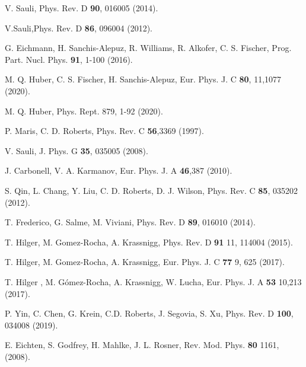 \documentclass[aps,prd,superscriptaddress,eqsecnum,amsfonts,showpacs,epsfig]{revtex4}
\begin{document}
\begin{thebibliography}{00}
V. Sauli, Phys. Rev. D {\bf 90}, 016005 (2014).

V.Sauli,Phys. Rev. D {\bf 86}, 096004 (2012).

G. Eichmann, H. Sanchis-Alepuz, R. Williams, R. Alkofer, C. S. Fischer, Prog. Part. Nucl. Phys. {\bf 91}, 1-100 (2016).

 M. Q. Huber, C. S. Fischer, H. Sanchis-Alepuz,  Eur. Phys. J. C {\bf 80}, 11,1077 (2020).
 
 M. Q. Huber,  Phys. Rept. 879, 1-92 (2020).
    
P. Maris, C. D. Roberts, Phys. Rev. C {\bf 56},3369 (1997).

V. Sauli, J. Phys. G {\bf 35}, 035005 (2008).

 J. Carbonell, V. A. Karmanov, Eur. Phys. J. A {\bf 46},387 (2010).

S. Qin, L. Chang, Y. Liu, C. D. Roberts, D. J. Wilson,    Phys. Rev. C {\bf 85},  035202 (2012).

T. Frederico, G. Salme, M. Viviani, Phys. Rev. D {\bf 89}, 016010 (2014).

T. Hilger, M. Gomez-Rocha, A. Krassnigg,    Phys. Rev. D {\bf 91} 11, 114004 (2015).

 T. Hilger, M. Gomez-Rocha, A. Krassnigg,   Eur. Phys. J. C {\bf 77} 9, 625 (2017).

T. Hilger , M. Gómez-Rocha, A. Krassnigg, W. Lucha, Eur. Phys. J. A {\bf 53} 10,213  (2017).

P. Yin, C. Chen, G. Krein, C.D. Roberts, J. Segovia, S. Xu,  Phys. Rev. D {\bf 100},  034008 (2019).

E. Eichten, S. Godfrey, H. Mahlke, J. L. Rosner, Rev. Mod. Phys. {\bf 80} 1161, (2008).


\end{thebibliography}
\end{document}

